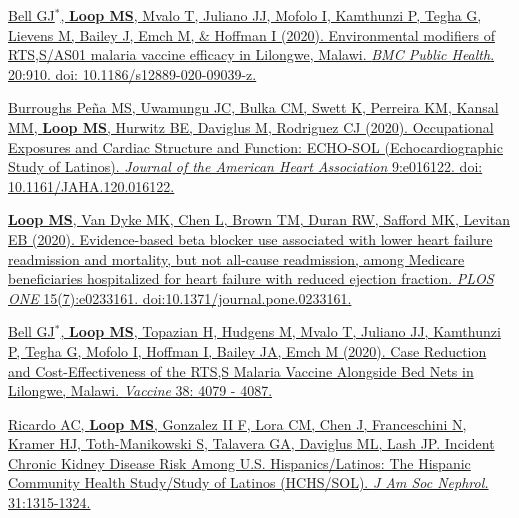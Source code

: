 \documentclass[10pt,letterpaper]{article}
\begin{document}
\begin{etaremune}
\item \href{https://bmcpublichealth.biomedcentral.com/articles/10.1186/s12889-020-09039-z}{Bell GJ$^*$, \textbf{Loop MS}, Mvalo T, Juliano JJ, Mofolo I, Kamthunzi P, Tegha G, Lievens M, Bailey J, Emch M, \& Hoffman I (2020). Environmental modifiers of RTS,S/AS01 malaria vaccine efficacy in Lilongwe, Malawi. \emph{BMC Public Health}. 20:910. doi: 10.1186/s12889-020-09039-z.}

\item \href{https://www.ahajournals.org/doi/pdf/10.1161/JAHA.120.016122}{Burroughs Pe\~{n}a MS, Uwamungu JC, Bulka CM, Swett K, Perreira KM, Kansal MM, \textbf{Loop MS}, Hurwitz BE, Daviglus M, Rodriguez CJ (2020). Occupational Exposures and Cardiac Structure and Function: ECHO-SOL (Echocardiographic Study of Latinos). \emph{Journal of the American Heart Association} 9:e016122. doi: 10.1161/JAHA.120.016122.}

\item \href{https://journals.plos.org/plosone/article?id=10.1371/journal.pone.0233161}{\textbf{Loop MS}, Van Dyke MK, Chen L, Brown TM, Duran RW, Safford MK, Levitan EB (2020). Evidence-based beta blocker use associated with lower heart failure readmission and mortality, but not all-cause readmission, among Medicare beneficiaries hospitalized for heart failure with reduced ejection fraction. \emph{PLOS ONE} 15(7):e0233161. doi:10.1371/journal.pone.0233161.}

\item \href{https://www.sciencedirect.com/science/article/pii/S0264410X20305119}{Bell GJ$^*$, \textbf{Loop MS}, Topazian H, Hudgens M, Mvalo T, Juliano JJ, Kamthunzi P, Tegha G, Mofolo I, Hoffman I, Bailey JA, Emch M (2020). Case Reduction and Cost-Effectiveness of the RTS,S Malaria Vaccine Alongside Bed Nets in Lilongwe, Malawi. \emph{Vaccine} 38: 4079 - 4087.}

\item \href{https://jasn.asnjournals.org/content/jnephrol/31/6/1315.full.pdf}{Ricardo AC, \textbf{Loop MS}, Gonzalez II F, Lora CM, Chen J, Franceschini N, Kramer HJ, Toth-Manikowski S, Talavera GA, Daviglus ML, Lash JP. Incident Chronic Kidney Disease Risk Among U.S. Hispanics/Latinos: The Hispanic Community Health Study/Study of Latinos (HCHS/SOL). \emph{J Am Soc Nephrol.} 31:1315-1324.}


\end{etaremune}
\end{document}
